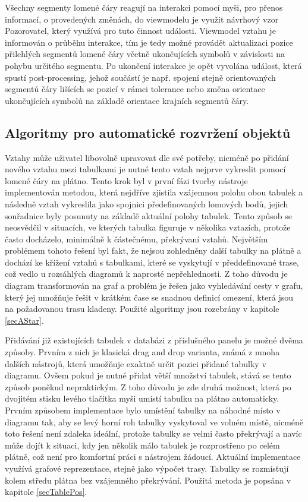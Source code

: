 \documentclass[czech,bachelor,public,dept460,male,oneside]{diploma}
\begin{document}
		Všechny segmenty lomené čáry reagují na interakci pomocí myši, pro přenos informací, o provedených změnách, do viewmodelu je využit návrhový vzor Pozorovatel, který využívá pro tuto činnost události. Viewmodel vztahu je informován o průběhu interakce, tím je tedy možné provádět aktualizaci pozice přilehlých segmentů lomené čáry včetně ukončujících symbolů v závislosti na pohybu určitého segmentu. Po ukončení interakce je opět vyvolána událost, která spustí post-processing, jehož součástí je např. spojení stejně orientovaných segmentů čáry lišících se pozicí v rámci tolerance nebo změna orientace ukončujících symbolů na základě orientace krajních segmentů čáry.
		
	\subsection{Algoritmy pro automatické rozvržení objektů}
	Vztahy může uživatel libovolně upravovat dle své potřeby, nicméně po přidání nového vztahu mezi tabulkami je nutné tento vztah nejprve vykreslit pomocí lomené čáry na plátno. Tento krok byl v první fázi tvorby nástroje implementován metodou, která nejdříve zjistila vzájemnou polohu obou tabulek a následně vztah vykreslila jako spojnici předefinovaných lomových bodů, jejich souřadnice byly posunuty na základě aktuální polohy tabulek. Tento způsob se neosvědčil v situacích, ve kterých tabulka figuruje v několika vztazích, protože často docházelo, minimálně k částečnému, překrývaní vztahů. Největším problémem tohoto řešení byl fakt, že nejsou zohledněny další tabulky na plátně a dochází ke křížení vztahů s tabulkami, které se vyskytují v předdefinované trase, což vedlo u rozsáhlých diagramů k naprosté nepřehlednosti. Z toho důvodu je diagram transformován na graf a problém je řešen jako vyhledávání cesty v grafu, který jej umožňuje  řešit v krátkém čase se snadnou definicí omezení, která jsou na požadovanou trasu kladeny. Použité algoritmy jsou rozebrány v kapitole \ref{secAStar}.
	
	Přidávání již existujících tabulek v databázi z příslušného panelu je možné dvěma způsoby. Prvním z nich je klasická drag and drop varianta, známá z mnoha dalších nástrojů, která umožňuje exaktně určit pozici přidané tabulky v diagramu. Ovšem pokud je nutné přidat větší množství tabulek, stává se tento způsob poněkud nepraktickým. Z toho důvodu je zde druhá možnost, která po dvojitém stisku levého tlačítka myši umístí tabulku na plátno automaticky. Prvním způsobem implementace bylo umístění tabulky na náhodné místo v diagramu tak, aby se levý horní roh tabulky vyskytoval ve volném místě, nicméně toto řešení není zdaleka ideální, protože tabulky se velmi často překrývají a navíc může dojít k situaci, kdy jen několik málo tabulek je rozprostřeno po celém plátně, což není pro komfortní práci s nástrojem žádoucí. Aktuální implementace využívá grafové reprezentace, stejně jako výpočet trasy. Tabulky se rozmísťují kolem středu plátna  bez vzájemného překrývání. Použitá metoda je popsána v kapitole \ref{secTablePos}.
	
\end{document}
